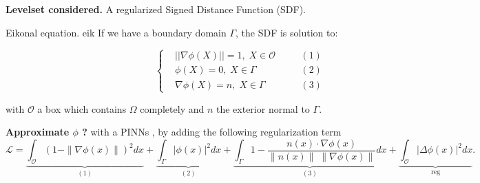 \begin{columns}
{\begin{center}
        \begin{tcolorbox}[
            colback=color1!50, %
            colframe=color2, %
            arc=2mm, %
            boxrule=2pt, %
            breakable, enhanced jigsaw,
            width=\linewidth
            ]            
            \textbf{Levelset considered.} A regularized Signed Distance Function (SDF).

            \hypersetup{citecolor=white}

            \begin{mytheo}{Eikonal equation. \cite{clemot_neural_2023}}{eik}
                If we have a boundary domain $\Gamma$, the SDF is solution to:
                
                \begin{minipage}{0.9\linewidth}
                    \hspace{350pt}
                    \begin{equation*}
                        \left\{\begin{aligned}
                            &||\nabla\phi(X)||=1, \; X\in\mathcal{O} \quad &&(1) \\
                            &\phi(X)=0, \; X\in\Gamma &&(2) \\
                            &\nabla\phi(X)=n, \; X\in\Gamma &&(3)
                        \end{aligned}\right.
                    \end{equation*}
                \end{minipage}
                
                with $\mathcal{O}$ a box which contains $\Omega$ completely and $n$ the exterior normal to $\Gamma$.
            \end{mytheo}

            \hypersetup{citecolor=color2}
            
            \vspace{-5pt}
            \textbf{Approximate $\phi$ ?} with a PINNs \cite{clemot_neural_2023}, by adding the following regularization term
            \begin{equation*}
                \mathcal{L} = \underbrace{\int_\mathcal{O} \left( 1 - \|\nabla\phi(x)\|\right)^2dx}_{(1)}
                + \underbrace{\int_\Gamma |\phi(x)|^2dx}_{(2)} 
                + \underbrace{\int_\Gamma 1 - \frac{n(x)\cdot\nabla\phi(x)}{\|n(x)\|\;\|\nabla\phi(x)\|}dx}_{(3)} 
                + \underbrace{\int_\mathcal{O} |\Delta\phi(x)|^2dx}_{\text{reg}}.
            \end{equation*} 
        \end{tcolorbox}
    \end{center}
    \vspace{-30pt}	
}


\end{columns}
